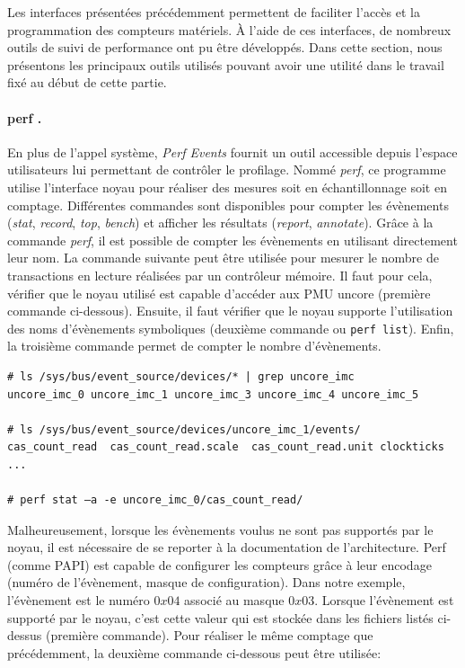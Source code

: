         Les interfaces présentées précédemment permettent de faciliter l'accès et la programmation des compteurs matériels. À l'aide de ces interfaces, de nombreux outils de suivi de performance ont pu être développés. Dans cette section, nous présentons les principaux outils utilisés pouvant avoir une utilité dans le travail fixé au début de cette partie.

        \paragraph{perf \cite{Weaver2013}.} 
            
            En plus de l'appel système, \textit{Perf Events} fournit un outil accessible depuis l'espace utilisateurs lui permettant de contrôler le profilage. Nommé \textit{perf}, ce programme utilise l'interface noyau pour réaliser des mesures soit en échantillonnage soit en comptage. Différentes commandes sont disponibles pour compter les évènements (\textit{stat}, \textit{record}, \textit{top}, \textit{bench}) et afficher les résultats (\textit{report}, \textit{annotate}). Grâce à la commande \textit{perf}, il est possible de compter les évènements en utilisant directement leur nom. La commande suivante peut être utilisée pour mesurer le nombre de transactions en lecture réalisées par un contrôleur mémoire. Il faut pour cela, vérifier que le noyau utilisé est capable d'accéder aux PMU uncore (première commande ci-dessous). Ensuite, il faut vérifier que le noyau supporte l'utilisation des noms d'évènements symboliques (deuxième commande ou \verb|perf list|). Enfin, la troisième commande permet de compter le nombre d'évènements.
            
\begin{verbatim}
# ls /sys/bus/event_source/devices/* | grep uncore_imc
uncore_imc_0 uncore_imc_1 uncore_imc_3 uncore_imc_4 uncore_imc_5

# ls /sys/bus/event_source/devices/uncore_imc_1/events/
cas_count_read  cas_count_read.scale  cas_count_read.unit clockticks ...         

# perf stat –a -e uncore_imc_0/cas_count_read/
\end{verbatim}
            
            Malheureusement, lorsque les évènements voulus ne sont pas supportés par le noyau, il est nécessaire de se reporter à la documentation de l'architecture. Perf (comme PAPI) est capable de configurer les compteurs grâce à leur encodage (numéro de l'évènement, masque de configuration). Dans notre exemple, l'évènement est le numéro $0x04$ associé au masque $0x03$. Lorsque l'évènement est supporté par le noyau, c'est cette valeur qui est stockée dans les fichiers listés ci-dessus (première commande). Pour réaliser le même comptage que précédemment, la deuxième commande ci-dessous peut être utilisée:

